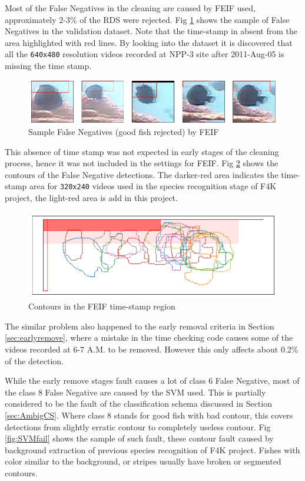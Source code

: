 \documentclass[bsc,logo,twoside,fullspacing,parskip]{infthesis}
\begin{document}
Most of the False Negatives in the cleaning are caused by FEIF used, approximately 2-3\% of the RDS were rejected. 
Fig \ref{fig:feiffail} shows the sample of False Negatives in the validation dataset.
Note that the time-stamp in absent from the area highlighted with red lines.
By looking into the dataset it is discovered that all the {\tt 640x480} resolution videos recorded at NPP-3 site after 2011-Aug-05 is missing the time stamp.

\begin{figure}[h]
    \centering
    \includegraphics[scale=0.40]{graph/FEIFfail.png}
    \caption{Sample False Negatives (good fish rejected) by FEIF}
    \label{fig:feiffail}
\end{figure}

This absence of time stamp was not expected in early stages of the cleaning process, hence it was not included in the settings for FEIF. 
Fig \ref{fig:feiffail2} shows the contours of the False Negative detections.
The darker-red area indicates the time-stamp area for {\tt 320x240} videos used in the species recognition stage of F4K project, the light-red area is add in this project.

\begin{figure}[h]
    \centering
    \includegraphics[scale=0.30]{graph/feiffail.png}
    \caption{Contours in the FEIF time-stamp region}
    \label{fig:feiffail2}
\end{figure}

The similar problem also happened to the early removal criteria in Section \ref{sec:earlyremove}, where a mistake in the time checking code causes some of the videos recorded at 6-7 A.M. to be removed. However this only affects about 0.2\% of the detection.

While the early remove stages fault causes a lot of class 6 False Negative, most of the class 8 False Negative are caused by the SVM used.
This is partially considered to be the fault of the classification schema discussed in Section \ref{sec:AmbigCS}.
Where class 8 stands for good fish with bad contour, this covers detections from slightly erratic contour to completely useless contour.
Fig \ref{fig:SVMfail} shows the sample of such fault, these contour fault caused by background extraction of previous species recognition of F4K project.
Fishes with color similar to the background, or stripes usually have broken or segmented contours.
\end{document}
